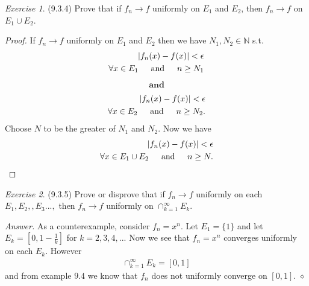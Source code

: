 \documentclass[12pt,oneside]{amsart}
\theoremstyle{definition}
\theoremstyle{remark}
\newtheorem{exer}{Exercise}
\numberwithin{equation}{exer}
\newenvironment{answer}{\bigskip\noindent\emph{Answer.}}{\hfill$\diamond$\newline}
\begin{document}
\newpage

\indent \newline

\begin{exer} (9.3.4)
Prove that if $f_n \to f$ uniformly on $E_1$ and $E_2$, then $f_n \to f$ on $E_1 \cup E_2$.

\end{exer}

\begin{proof}
If $f_n \to f$ uniformly on $E_1$ and $E_2$ then we have $N_1,N_2 \in \mathbb{N}$ s.t. 
\begin{align*}
    |f_n(x) - f(x)| < \epsilon \\
    \forall x \in E_1 \indent \text{and} \indent n\geq N_1
    \end{align*}
\begin{align*}
    \textbf{and}
\end{align*}
\begin{align*}
    |f_n(x) - f(x)| < \epsilon \\
    \forall x \in E_2 \indent \text{and} \indent n\geq N_2.
\end{align*}
Choose $N$ to be the greater of $N_1$ and $N_2$. Now we have
\begin{align*}
    |f_n(x) - f(x)| < \epsilon\\
        \forall x \in E_1\cup E_2 \indent \text{and} \indent n\geq N.
\end{align*}
\end{proof}
\newpage
\indent \newline
\begin{exer} (9.3.5)
Prove or disprove that if $f_n \to f$ uniformly on each $E_1,E_2,,E_3...,$ then $f_n \to f$ uniformly on $\cap_{k=1}^\infty E_k$.
\end{exer}
\begin{answer}
\indent As a counterexample, consider $f_n = x^n$. Let $E_1 = \{1\}$ and let $E_k = [0, 1-\frac{1}{k}]$ for $k= 2,3,4,..$. Now we see that $f_n = x^n$ converges uniformly on each $E_k$. However 
\begin{align*}
    \cap_{k=1}^\infty E_k = [0,1]
\end{align*}
and from example $9.4$ we know that $f_n$ does not uniformly converge on $[0,1]$.
\end{answer}
\end{document}

